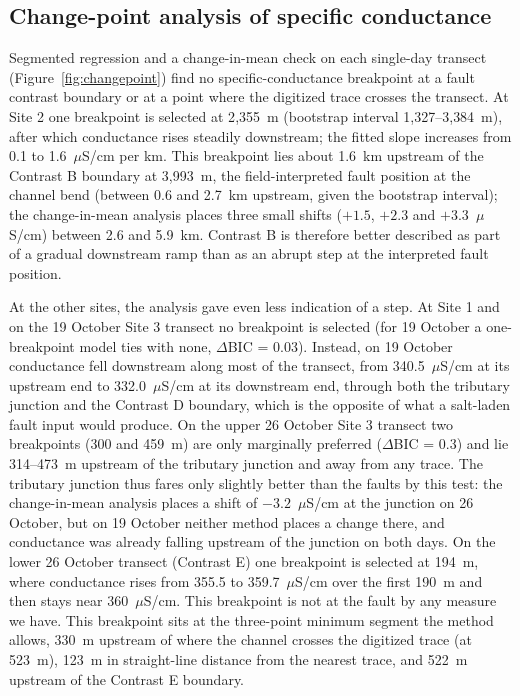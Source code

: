 \documentclass{article}
\begin{document}
\subsection{Change-point analysis of specific conductance}

Segmented regression and a change-in-mean check on each single-day transect (Figure~\ref{fig:changepoint}) find no specific-conductance breakpoint at a fault contrast boundary or at a point where the digitized trace crosses the transect. At Site 2 one breakpoint is selected at 2{,}355~m (bootstrap interval 1{,}327--3{,}384~m), after which conductance rises steadily downstream; the fitted slope increases from 0.1 to 1.6~$\mu$S/cm per km. This breakpoint lies about 1.6~km upstream of the Contrast B boundary at 3{,}993~m, the field-interpreted fault position at the channel bend (between 0.6 and 2.7~km upstream, given the bootstrap interval); the change-in-mean analysis places three small shifts ($+1.5$, $+2.3$ and $+3.3$~$\mu$S/cm) between 2.6 and 5.9~km. Contrast B is therefore better described as part of a gradual downstream ramp than as an abrupt step at the interpreted fault position.

At the other sites, the analysis gave even less indication of a step. At Site 1 and on the 19 October Site 3 transect no breakpoint is selected (for 19 October a one-breakpoint model ties with none, $\Delta$BIC = 0.03). Instead, on 19 October conductance fell downstream along most of the transect, from 340.5~$\mu$S/cm at its upstream end to 332.0~$\mu$S/cm at its downstream end, through both the tributary junction and the Contrast D boundary, which is the opposite of what a salt-laden fault input would produce. On the upper 26 October Site 3 transect two breakpoints (300 and 459~m) are only marginally preferred ($\Delta$BIC = 0.3) and lie 314--473~m upstream of the tributary junction and away from any trace. The tributary junction thus fares only slightly better than the faults by this test: the change-in-mean analysis places a shift of $-3.2$~$\mu$S/cm at the junction on 26 October, but on 19 October neither method places a change there, and conductance was already falling upstream of the junction on both days. On the lower 26 October transect (Contrast E) one breakpoint is selected at 194~m, where conductance rises from 355.5 to 359.7~$\mu$S/cm over the first 190~m and then stays near 360~$\mu$S/cm. This breakpoint is not at the fault by any measure we have. This breakpoint sits at the three-point minimum segment the method allows, 330~m upstream of where the channel crosses the digitized trace (at 523~m), 123~m in straight-line distance from the nearest trace, and 522~m upstream of the Contrast E boundary.
\end{document}
